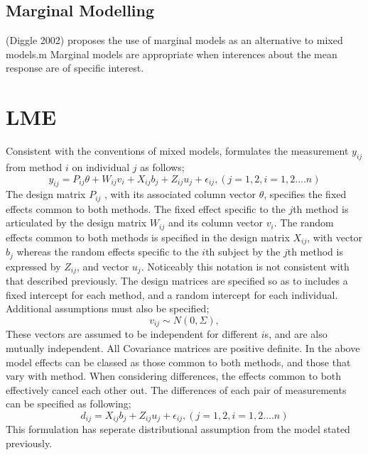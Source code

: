 \documentclass[12pt, a4paper]{report}
\theoremstyle{plain}
\theoremstyle{definition}
\theoremstyle{remark}
\begin{document}
\subsection{Marginal Modelling}
(Diggle 2002) proposes the use of marginal models as an
alternative to mixed models.m Marginal models are appropriate when
interences about the mean response are of specific interest.



\newpage

\section{LME}
Consistent with the conventions of mixed models, \citet{pkc}
formulates the measurement $y_{ij} $from method $i$ on individual
$j$ as follows;
\begin{equation}
y_{ij} =P_{ij}\theta + W_{ij}v_{i} + X_{ij}b_{j} + Z_{ij}u_{j} +
\epsilon_{ij},     (j=1,2, i=1,2....n)
\end{equation}
The design matrix $P_{ij}$ , with its associated column vector
$\theta$, specifies the fixed effects common to both methods. The
fixed effect specific to the $j$th method is articulated by the
design matrix $W_{ij}$ and its column vector $v_{i}$. The random
effects common to both methods is specified in the design matrix
$X_{ij}$, with vector $b_{j}$ whereas the random effects specific
to the $i$th subject by the $j$th method is expressed by $Z_{ij}$,
and vector $u_{j}$. Noticeably this notation is not consistent
with that described previously.  The design matrices are specified
so as to includes a fixed intercept for each method, and a random
intercept for each individual. Additional assumptions must also be
specified;
\begin{equation}
v_{ij} \sim N(0,\Sigma),
\end{equation}
These vectors are assumed to be independent for different $i$s,
and are also mutually independent. All Covariance matrices are
positive definite.  In the above model effects can be classed as
those common to both methods, and those that vary with method.
When considering differences, the effects common to both
effectively cancel each other out. The differences of each pair of
measurements can be specified as following;
\begin{equation}
d_{ij} = X_{ij}b_{j} + Z_{ij}u_{j} + \epsilon_{ij},     (j=1,2,
i=1,2....n)
\end{equation}
This formulation has seperate distributional assumption from the
model stated previously.
\end{document}
